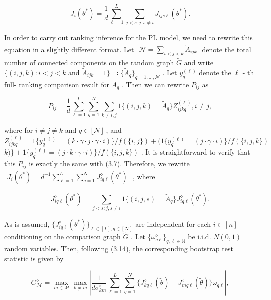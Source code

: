 \[
J_{i}(\theta^{*}) = \frac{1}{d} \sum_{\ell = 1}^{L} \sum_{j < s:j, s \neq i} J_{ijs\ell}(\theta^{*}).
\]

In order to carry out ranking inference for the PL model, we need to
rewrite this equation in a slightly different format. Let
\(\begin{array}{r}{\mathcal{N} = \sum_{i< j< k}\widetilde{A}_{i j k}} \end{array}\)
denote the total number of connected components on the random graph
\(\widetilde{G}\) and write \(\{(i,j,k):i< j< k\) and
\(\widetilde{A}_{i j k} = 1\} \eqqcolon \{\widetilde{A}_{q}\}_{q = 1,\ldots ,\mathcal{N}}\)
. Let \(y_{q}^{(\ell)}\) denote the \(\ell\) - th full- ranking
comparison result for \(A_{q}\) . Then we can rewrite \(P_{ij}\) as

\[
P_{ij} = \frac{1}{d} \sum_{\ell = 1}^{L} \sum_{q = 1}^{N} \sum_{k \neq i, j} 1\{(i,j,k) = \widetilde{A}_{q}\} Z_{ijkq}^{(\ell)}, i \neq j,
\]

where for \(i\neq j\neq k\) and \(q\in \lfloor \mathcal{N}\rfloor\) ,
and
\(Z_{i j k q}^{(\ell)} = 1\{y_{q}^{(\ell)} = (k\cdot \gamma \cdot j\cdot \gamma \cdot i)\} /f(\{i,j\}) + (1\{y_{q}^{(\ell)} = (j\cdot \gamma \cdot i)\} /f(\{i,j,k\})\)
\(k)\} +1\{y_{q}^{(\ell)} = (j\cdot k\cdot \gamma \cdot i)\} /f(\{i,j,k\})\)
. It is straightforward to verify that this \(P_{ij}\) is exactly the
same with (3.7). Therefore, we rewrite
\(\begin{array}{r}{J_{i}(\theta^{*}) = d^{- 1}\sum_{\ell = 1}^{L}\sum_{q = 1}^{N}J_{i q\ell}^{\diamond}(\theta^{*})} \end{array}\)
, where

\[
J_{iq\ell}^{\diamond}(\theta^{*}) = \sum_{j < s:j, s \neq i} 1\{(i,j,s) = \widetilde{A}_{q}\} J_{iq\ell}^{\diamond}(\theta^{*}). \tag{3.18}
\]

As is assumed,
\(\{J_{iq\ell}^{\diamond}(\theta^{*})\}_{\ell \in [L], q \in [\mathcal{N}]}\)
are independent for each \(i \in [n]\) conditioning on the comparison
graph \(\widetilde{G}\) . Let
\(\{\omega_{q\ell}^{\diamond}\}_{q, \ell \in \mathbb{N}}\) be i.i.d.
\(N(0,1)\) random variables. Then, following (3.14), the corresponding
bootstrap test statistic is given by

\[
G_{\mathcal{M}}^{\diamond} = \max_{m \in \mathcal{M}} \max_{k \neq m} \left| \frac{1}{d \sigma_{km}^{\diamond}} \sum_{\ell = 1}^{L} \sum_{q = 1}^{N} \{J_{kq\ell}^{\diamond}(\widetilde{\theta}) - J_{mq\ell}^{\diamond}(\widetilde{\theta})\} \omega_{q\ell} \right|,
\]

